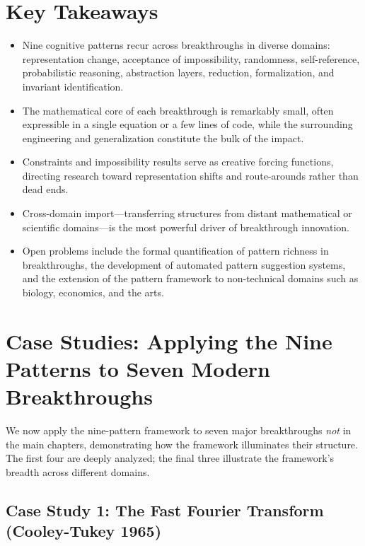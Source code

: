 \section*{Key Takeaways}
\begin{itemize}
\item Nine cognitive patterns recur across breakthroughs in diverse domains: representation change, acceptance of impossibility, randomness, self-reference, probabilistic reasoning, abstraction layers, reduction, formalization, and invariant identification.
\item The mathematical core of each breakthrough is remarkably small, often expressible in a single equation or a few lines of code, while the surrounding engineering and generalization constitute the bulk of the impact.
\item Constraints and impossibility results serve as creative forcing functions, directing research toward representation shifts and route-arounds rather than dead ends.
\item Cross-domain import---transferring structures from distant mathematical or scientific domains---is the most powerful driver of breakthrough innovation.
\item Open problems include the formal quantification of pattern richness in breakthroughs, the development of automated pattern suggestion systems, and the extension of the pattern framework to non-technical domains such as biology, economics, and the arts.
\end{itemize}

\section{Case Studies: Applying the Nine Patterns to Seven Modern Breakthroughs}
\label{sec:anatomy:case_studies}

We now apply the nine-pattern framework to seven major breakthroughs \emph{not} in the main chapters, demonstrating how the framework illuminates their structure. The first four are deeply analyzed; the final three illustrate the framework's breadth across different domains.

\subsection{Case Study 1: The Fast Fourier Transform (Cooley-Tukey 1965)}

